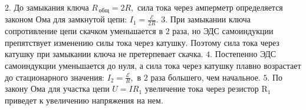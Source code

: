 \documentclass[12pt,a4paper]{article}
\begin{document}
{$2$.  До замыкания ключа $R_{\,\text{общ}}=2R,$ сила тока через амперметр определяется законом Ома для замкнутой цепи: $I_1= \frac{\mathcal{E}}{2R} .$ 
$3$.  При замыкании ключа сопротивление цепи скачком уменьшается в $2$ раза, но ЭДС самоиндукции препятствует изменению силы тока через катушку. Поэтому сила тока через катушку при замыкании ключа не претерпевает скачка. 
$4$.  Постепенно ЭДС самоиндукции уменьшается до нуля, а сила тока через катушку плавно возрастает до стационарного значения: $I_2= \frac{\mathcal{E}}{R} ,$ в $2$ раза большего, чем начальное. 
$5$.  По закону Ома для участка цепи $U=IR_1$ увеличение тока через резистор R$_{1}$ приведет к увеличению напряжения на нем.
}
\end{document}

